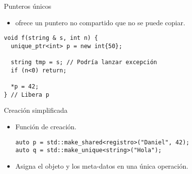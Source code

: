 \begin{frame}[t,fragile]{Punteros únicos}
\begin{itemize}
  \item {} ofrece un puntero no compartido que no se puede copiar.
\end{itemize}

\begin{lstlisting}
void f(string & s, int n) {
  unique_ptr<int> p = new int{50};

  string tmp = s; // Podría lanzar excepción
  if (n<0) return;

  *p = 42;
} // Libera p
\end{lstlisting}
\end{frame}

\begin{frame}[t,fragile]{Creación simplificada}
\begin{itemize}
  \item Función de creación.
\begin{lstlisting}
auto p = std::make_shared<registro>("Daniel", 42);
auto q = std::make_unique<string>("Hola");
\end{lstlisting}
  \item Asigna el objeto y los meta-datos en una única operación.
\end{itemize}
\end{frame}

